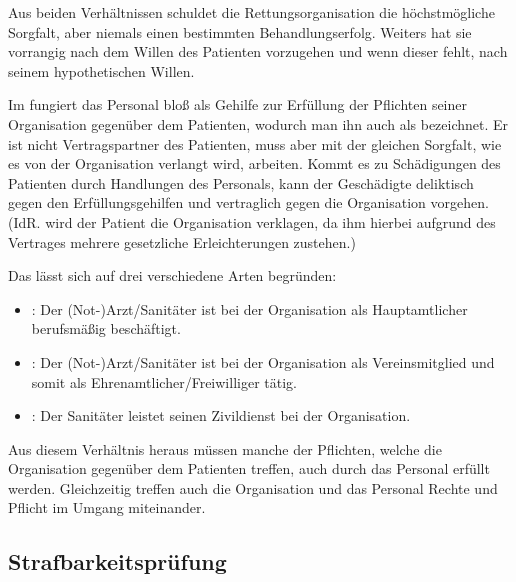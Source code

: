 Aus beiden Verhältnissen schuldet die Rettungsorganisation die
höchstmögliche Sorgfalt, aber niemals einen bestimmten
Behandlungserfolg. Weiters hat sie vorrangig nach dem
Willen des Patienten vorzugehen und wenn dieser fehlt, nach
seinem hypothetischen Willen.

Im  fungiert das Personal
bloß als Gehilfe zur Erfüllung der Pflichten seiner Organisation gegenüber
dem Patienten, wodurch man ihn auch als
 bezeichnet. Er ist nicht
Vertragspartner des Patienten, muss aber mit der gleichen Sorgfalt, wie es
von der Organisation verlangt wird, arbeiten. Kommt es zu
Schädigungen des Patienten durch Handlungen des
Personals, kann der Geschädigte deliktisch gegen den
Erfüllungsgehilfen und vertraglich gegen die Organisation vorgehen. (IdR. wird der
Patient die Organisation verklagen, da ihm hierbei aufgrund
des Vertrages mehrere gesetzliche Erleichterungen zustehen.)

Das  lässt sich auf drei verschiedene Arten
begründen:

\begin{itemize}
    \item {}: Der (Not-)Arzt/Sanitäter ist bei
    der Organisation als Hauptamtlicher berufsmäßig beschäftigt.
    
    \item {}: Der (Not-)Arzt/Sanitäter ist
    bei der Organisation als Vereinsmitglied und somit als
    Ehrenamtlicher/Freiwilliger tätig.
    
    \item {}: Der Sanitäter leistet seinen
    Zivildienst bei der Organisation.
    
\end{itemize}

Aus diesem Verhältnis heraus müssen manche der Pflichten, welche die
Organisation gegenüber dem Patienten treffen, auch
durch das Personal erfüllt werden. Gleichzeitig
treffen auch die Organisation und das Personal Rechte und
Pflicht im Umgang miteinander.

\subsection{Strafbarkeitsprüfung}

